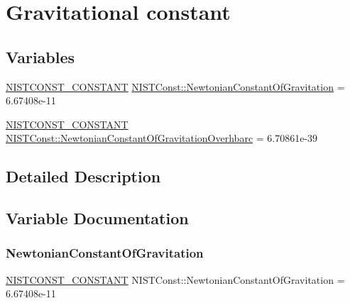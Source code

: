 \hypertarget{group___n_i_s_t_const-_gravitational_constant}{}\section{Gravitational constant}
\label{group___n_i_s_t_const-_gravitational_constant}
\subsection*{Variables}
\begin{DoxyCompactItemize}
\item 
\mbox{\hyperlink{group___n_i_s_t_const-_macros_ga2b0fc1d7452373f816175dd86ce26729}{N\+I\+S\+T\+C\+O\+N\+S\+T\+\_\+\+C\+O\+N\+S\+T\+A\+NT}} \mbox{\hyperlink{group___n_i_s_t_const-_gravitational_constant_gacfed5fae03e441055c1f09406a47f8ce}{N\+I\+S\+T\+Const\+::\+Newtonian\+Constant\+Of\+Gravitation}} = 6.\+67408e-\/11
\item 
\mbox{\hyperlink{group___n_i_s_t_const-_macros_ga2b0fc1d7452373f816175dd86ce26729}{N\+I\+S\+T\+C\+O\+N\+S\+T\+\_\+\+C\+O\+N\+S\+T\+A\+NT}} \mbox{\hyperlink{group___n_i_s_t_const-_gravitational_constant_gaab8e9e8695add729258bef9e2fc7e9bf}{N\+I\+S\+T\+Const\+::\+Newtonian\+Constant\+Of\+Gravitation\+Overhbarc}} = 6.\+70861e-\/39
\end{DoxyCompactItemize}


\subsection{Detailed Description}


\subsection{Variable Documentation}
\mbox{\label{group___n_i_s_t_const-_gravitational_constant_gacfed5fae03e441055c1f09406a47f8ce}} 
\subsubsection{\texorpdfstring{Newtonian\+Constant\+Of\+Gravitation}{NewtonianConstantOfGravitation}}
{\footnotesize\ttfamily \mbox{\hyperlink{group___n_i_s_t_const-_macros_ga2b0fc1d7452373f816175dd86ce26729}{N\+I\+S\+T\+C\+O\+N\+S\+T\+\_\+\+C\+O\+N\+S\+T\+A\+NT}} N\+I\+S\+T\+Const\+::\+Newtonian\+Constant\+Of\+Gravitation = 6.\+67408e-\/11}


